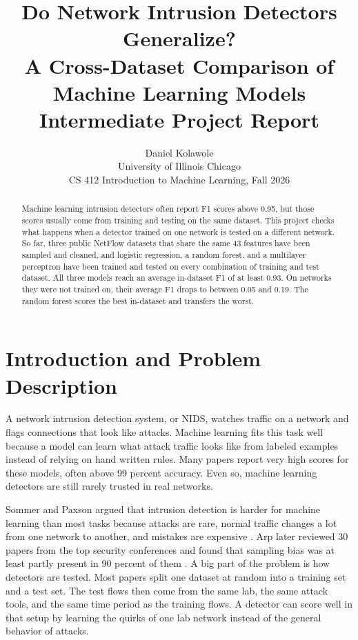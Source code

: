 \documentclass[10pt,twocolumn,letterpaper]{article}
\title{Do Network Intrusion Detectors Generalize?\\A Cross-Dataset Comparison of Machine Learning Models\\[4pt]\large Intermediate Project Report}
\author{Daniel Kolawole\\
University of Illinois Chicago\\
CS 412 Introduction to Machine Learning, Fall 2026}
\begin{document}
\maketitle

\begin{abstract}
Machine learning intrusion detectors often report F1 scores above 0.95, but those scores usually come from training and testing on the same dataset. This project checks what happens when a detector trained on one network is tested on a different network. So far, three public NetFlow datasets that share the same 43 features have been sampled and cleaned, and logistic regression, a random forest, and a multilayer perceptron have been trained and tested on every combination of training and test dataset. All three models reach an average in-dataset F1 of at least 0.93. On networks they were not trained on, their average F1 drops to between 0.05 and 0.19. The random forest scores the best in-dataset and transfers the worst.
\end{abstract}

\section{Introduction and Problem Description}

A network intrusion detection system, or NIDS, watches traffic on a network and flags connections that look like attacks. Machine learning fits this task well because a model can learn what attack traffic looks like from labeled examples instead of relying on hand written rules. Many papers report very high scores for these models, often above 99 percent accuracy. Even so, machine learning detectors are still rarely trusted in real networks.

Sommer and Paxson argued that intrusion detection is harder for machine learning than most tasks because attacks are rare, normal traffic changes a lot from one network to another, and mistakes are expensive \cite{sommer2010}. Arp \etal later reviewed 30 papers from the top security conferences and found that sampling bias was at least partly present in 90 percent of them \cite{arp2022}. A big part of the problem is how detectors are tested. Most papers split one dataset at random into a training set and a test set. The test flows then come from the same lab, the same attack tools, and the same time period as the training flows. A detector can score well in that setup by learning the quirks of one lab network instead of the general behavior of attacks.
\end{document}
